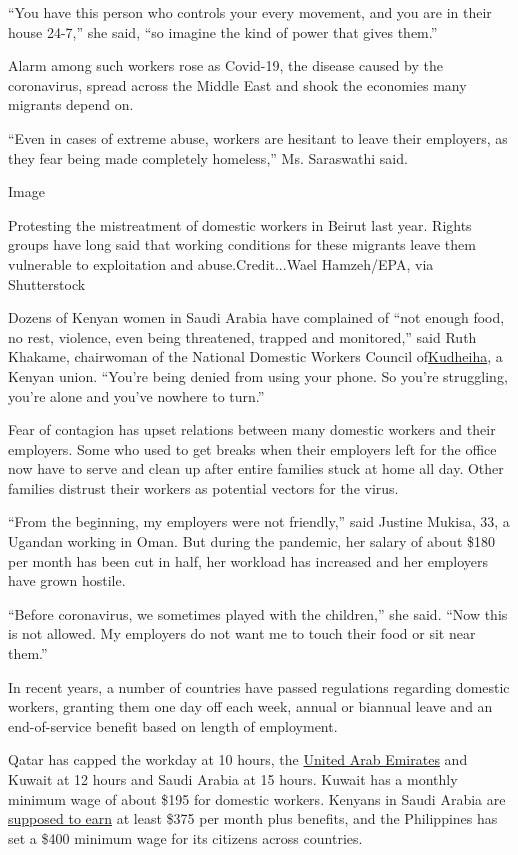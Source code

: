 ``You have this person who controls your every movement, and you are in
their house 24-7,'' she said, ``so imagine the kind of power that gives
them.''

Alarm among such workers rose as Covid-19, the disease caused by the
coronavirus, spread across the Middle East and shook the economies many
migrants depend on.

``Even in cases of extreme abuse, workers are hesitant to leave their
employers, as they fear being made completely homeless,'' Ms. Saraswathi
said.

Image

Protesting the mistreatment of domestic workers in Beirut last year.
Rights groups have long said that working conditions for these migrants
leave them vulnerable to exploitation and abuse.Credit...Wael
Hamzeh/EPA, via Shutterstock

Dozens of Kenyan women in Saudi Arabia have complained of ``not enough
food, no rest, violence, even being threatened, trapped and monitored,''
said Ruth Khakame, chairwoman of the National Domestic Workers Council
of\href{http://www.kudheiha.org/}{Kudheiha}, a Kenyan union. ``You're
being denied from using your phone. So you're struggling, you're alone
and you've nowhere to turn.''

Fear of contagion has upset relations between many domestic workers and
their employers. Some who used to get breaks when their employers left
for the office now have to serve and clean up after entire families
stuck at home all day. Other families distrust their workers as
potential vectors for the virus.

``From the beginning, my employers were not friendly,'' said Justine
Mukisa, 33, a Ugandan working in Oman. But during the pandemic, her
salary of about \$180 per month has been cut in half, her workload has
increased and her employers have grown hostile.

``Before coronavirus, we sometimes played with the children,'' she said.
``Now this is not allowed. My employers do not want me to touch their
food or sit near them.''

In recent years, a number of countries have passed regulations regarding
domestic workers, granting them one day off each week, annual or
biannual leave and an end-of-service benefit based on length of
employment.

Qatar has capped the workday at 10 hours, the
\href{https://www.nytimes3xbfgragh.onion/2020/07/14/science/mars-united-arab-emirates.html}{United
Arab Emirates} and Kuwait at 12 hours and Saudi Arabia at 15 hours.
Kuwait has a monthly minimum wage of about \$195 for domestic workers.
Kenyans in Saudi Arabia are
\href{https://www.standardmedia.co.ke/business/article/2001310333/pact-with-saudi-arabia-raises-kenyan-workers-minimum-pay}{supposed
to earn} at least \$375 per month plus benefits, and the Philippines has
set a \$400 minimum wage for its citizens across countries.


